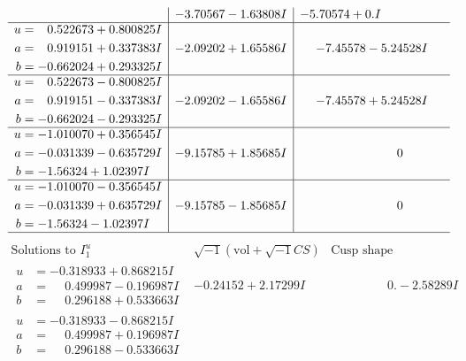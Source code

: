 \documentclass[1p]{elsarticle_modified}
\theoremstyle{definition}
\newcommand{\I}{\sqrt{-1}}
\begin{document}
$$\begin{array}{c|c|c}
 & -3.70567 - 1.63808 I & -5.70574 + 0. I\phantom{ +0.000000I} \\ \hline\begin{aligned}
u &= \phantom{-}0.522673 + 0.800825 I \\
a &= \phantom{-}0.919151 + 0.337383 I \\
b &= -0.662024 + 0.293325 I\end{aligned}
 & -2.09202 + 1.65586 I & -7.45578 - 5.24528 I \\ \hline\begin{aligned}
u &= \phantom{-}0.522673 - 0.800825 I \\
a &= \phantom{-}0.919151 - 0.337383 I \\
b &= -0.662024 - 0.293325 I\end{aligned}
 & -2.09202 - 1.65586 I & -7.45578 + 5.24528 I \\ \hline\begin{aligned}
u &= -1.010070 + 0.356545 I \\
a &= -0.031339 - 0.635729 I \\
b &= -1.56324 + 1.02397 I\end{aligned}
 & -9.15785 + 1.85685 I & \phantom{-0.000000 } 0 \\ \hline\begin{aligned}
u &= -1.010070 - 0.356545 I \\
a &= -0.031339 + 0.635729 I \\
b &= -1.56324 - 1.02397 I\end{aligned}
 & -9.15785 - 1.85685 I & \phantom{-0.000000 } 0\\
 \hline 
 \end{array}$$\newpage$$\begin{array}{c|c|c}  
\text{Solutions to }I^u_{1}& \I (\text{vol} + \sqrt{-1}CS) & \text{Cusp shape}\\
 \hline 
\begin{aligned}
u &= -0.318933 + 0.868215 I \\
a &= \phantom{-}0.499987 - 0.196987 I \\
b &= \phantom{-}0.296188 + 0.533663 I\end{aligned}
 & -0.24152 + 2.17299 I & \phantom{-0.000000 } 0. - 2.58289 I \\ \hline\begin{aligned}
u &= -0.318933 - 0.868215 I \\
a &= \phantom{-}0.499987 + 0.196987 I \\
b &= \phantom{-}0.296188 - 0.533663 I\end{aligned}

\end{array}$$
\end{document}
